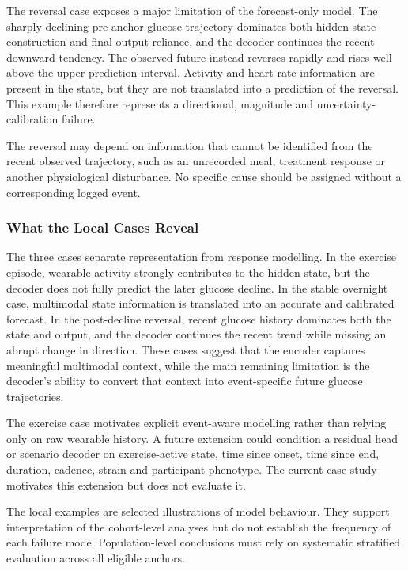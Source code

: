The reversal case exposes a major limitation of the forecast-only model. The
sharply declining pre-anchor glucose trajectory dominates both hidden state
construction and final-output reliance, and the decoder continues the recent
downward tendency. The observed future instead reverses rapidly and rises well
above the upper prediction interval. Activity and heart-rate information are
present in the state, but they are not translated into a prediction of the
reversal. This example therefore represents a directional, magnitude and
uncertainty-calibration failure.

The reversal may depend on information that cannot be identified from the
recent observed trajectory, such as an unrecorded meal, treatment response or
another physiological disturbance. No specific cause should be assigned without
a corresponding logged event.

\subsubsection{What the Local Cases Reveal}
\label{subsec:interp_case_synthesis}

The three cases separate representation from response modelling. In the
exercise episode, wearable activity strongly contributes to the hidden state,
but the decoder does not fully predict the later glucose decline. In the
stable overnight case, multimodal state information is translated into an
accurate and calibrated forecast. In the post-decline reversal, recent glucose
history dominates both the state and output, and the decoder continues the
recent trend while missing an abrupt change in direction. These cases suggest
that the encoder captures meaningful multimodal context, while the main
remaining limitation is the decoder's ability to convert that context into
event-specific future glucose trajectories.

The exercise case motivates explicit event-aware modelling rather than relying
only on raw wearable history. A future extension could condition a residual
head or scenario decoder on exercise-active state, time since onset, time since
end, duration, cadence, strain and participant phenotype. The current case
study motivates this extension but does not evaluate it.

The local examples are selected illustrations of model behaviour. They support
interpretation of the cohort-level analyses but do not establish the frequency
of each failure mode. Population-level conclusions must rely on systematic
stratified evaluation across all eligible anchors.
